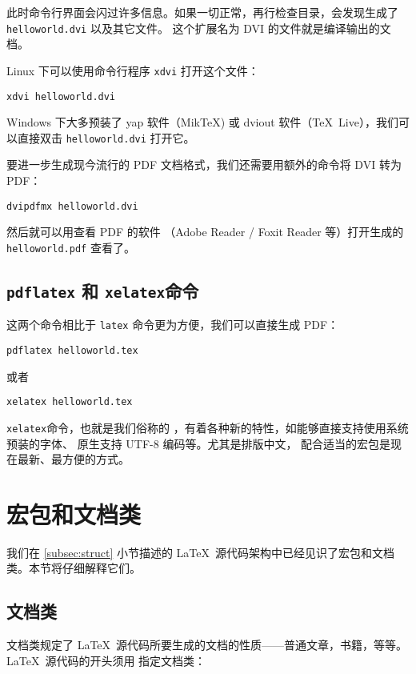 此时命令行界面会闪过许多信息。如果一切正常，再行检查目录，会发现生成了 \texttt{helloworld\-.dvi} 以及其它文件。
这个扩展名为 DVI 的文件就是编译输出的文档。

Linux 下可以使用命令行程序 \texttt{xdvi} 打开这个文件：
\begin{verbatim}
xdvi helloworld.dvi
\end{verbatim}

Windows 下大多预装了 yap 软件（Mik\TeX) 或 dviout 软件（\TeX\ Live），我们可以直接双击 \texttt{hello\-world.dvi} 打开它。

要进一步生成现今流行的 PDF 文档格式，我们还需要用额外的命令将 DVI 转为 PDF：
\begin{verbatim}
dvipdfmx helloworld.dvi
\end{verbatim}

然后就可以用查看 PDF 的软件 （Adobe Reader / Foxit Reader 等）打开生成的 \texttt{hello\-world.pdf} 查看了。

\subsection{\texttt{pdflatex} 和 \texttt{xelatex}命令}

这两个命令相比于 \texttt{latex} 命令更为方便，我们可以直接生成 PDF：
\begin{verbatim}
pdflatex helloworld.tex
\end{verbatim}

或者
\begin{verbatim}
xelatex helloworld.tex
\end{verbatim}

\texttt{xelatex}命令，也就是我们俗称的 ，有着各种新的特性，如能够直接支持使用系统预装的字体、
原生支持 UTF-8 编码等。尤其是排版中文， 配合适当的宏包是现在最新、最方便的方式。

\section{宏包和文档类}\label{sec:latex-pkgs}

我们在 \ref{subsec:struct} 小节描述的 \LaTeX\ 源代码架构中已经见识了宏包和文档类。本节将仔细解释它们。

\subsection{文档类}\label{subsec:classes}

文档类规定了 \LaTeX\ 源代码所要生成的文档的性质——普通文章，书籍，等等。\LaTeX\ 源代码的开头须用
指定文档类：
\begin{command}
\end{command}

